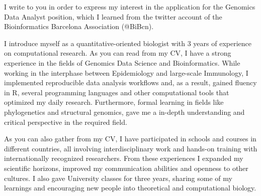\documentclass{letter} 					%
\begin{document}
\begin{letter}
\noindent 
I write to you in order to express my interest in the application for the Genomics Data Analyst position,
which I learned from the twitter account of the Bioinformatics Barcelona Association (@BiBcn).

\noindent 
I introduce myself as a quantitative-oriented biologist with 3 years of experience on computational research. 
As you can read from my CV, I have a strong experience in the fields of Genomics Data Science and Bioinformatics. 
While working in the interphase between Epidemiology and large-scale Immunology, 
I implemented reproducible data analysis workflows and, as a result, gained fluency in R, several programming languages and other computational tools that optimized my daily research.
Furthermore, formal learning in fields like phylogenetics and structural genomics, gave me
a in-depth understanding and critical perspective in the required field.

\noindent 
As you can also gather from my CV, 
I have participated in schools and courses in different countries, all involving interdisciplinary work and hands-on training with internationally recognized researchers. 
From these experiences I expanded my scientific horizons, improved my communication abilities and openness to other cultures. 
I also gave University classes for three years, sharing some of my learnings and encouraging new people into theoretical and computational biology.


\end{letter}
\end{document}
